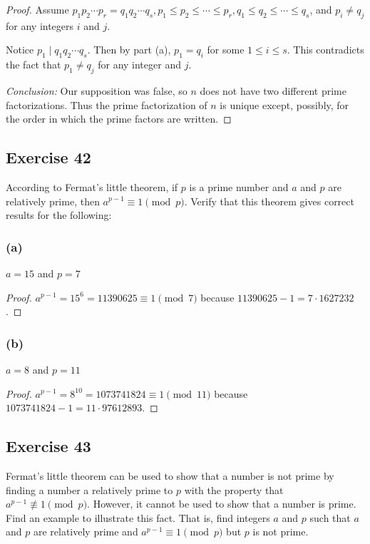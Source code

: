 \documentclass[14pt]{extarticle}
\begin{document}
\begin{proof}
Assume \(p_1 p_2 \cdots p_r = q_1 q_2 \cdots q_s, p_1 \leq p_2 \leq \cdots \leq p_r, q_1 \leq q_2 \leq \cdots \leq 
q_s\), and \(p_i \neq q_j\) for any integers $i$ and $j$.

Notice \(p_1 \mid q_1 q_2 \cdots q_s\). Then by part (a), \(p_1 = q_i\) for some \(1 \leq i \leq s\). This contradicts
the fact that \(p_1 \neq q_j\) for any integer and $j$.

{\it Conclusion:} Our supposition was false, so $n$ does not have two different prime factorizations. Thus the 
prime factorization of $n$ is unique except, possibly, for the order in which the prime factors are written.
\end{proof}

\subsection{Exercise 42}
According to Fermat’s little theorem, if $p$ is a prime number and $a$ and $p$ are relatively prime, then \(a^{p-1} 
\equiv 1 \pmod p\). Verify that this theorem gives correct results for the following:

\subsubsection{(a)}
\(a = 15\) and \(p = 7\)

\begin{proof}
\(a^{p-1} = 15^6 = 11390625 \equiv 1 \pmod 7\) because \(11390625 - 1 = 7 \cdot 1627232\).
\end{proof}

\subsubsection{(b)}
\(a = 8\) and \(p = 11\)

\begin{proof}
\(a^{p-1} = 8^{10} = 1073741824 \equiv 1 \pmod 11\) because \(1073741824 - 1 = 11 \cdot 97612893\).
\end{proof}

\subsection{Exercise 43}
Fermat’s little theorem can be used to show that a number is not prime by finding a number a relatively prime to $p$ 
with the property that \(a^{p-1} \not\equiv 1 \pmod p\). However, it cannot be used to show that a number is prime. 
Find an example to illustrate this fact. That is, find integers $a$ and $p$ such that $a$ and $p$ are relatively 
prime and \(a^{p-1} \equiv 1 \pmod p\) but $p$ is not prime.
\end{document}
